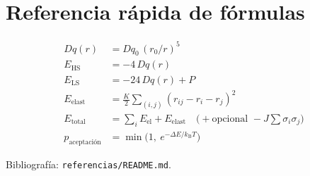\documentclass[11pt,a4paper]{article}
\newcommand{\HS}{\mathrm{HS}}
\newcommand{\LS}{\mathrm{LS}}
\newcommand{\Dq}{Dq}
\newcommand{\kb}{k_{\mathrm{B}}}
\begin{document}
\section{Referencia rápida de fórmulas}

\begin{align}
\Dq(r) &= \Dq_0\,(r_0/r)^5\\
E_{\HS} &= -4\,\Dq(r)\\
E_{\LS} &= -24\,\Dq(r) + P\\
E_{\mathrm{elast}} &= \frac{K}{2}\sum_{(i,j)}(r_{ij}-r_i-r_j)^2\\
E_{\mathrm{total}} &= \sum_i E_{\mathrm{el}} + E_{\mathrm{elast}} \quad \bigl(+\text{opcional } -J\sum\sigma_i\sigma_j\bigr)\\
p_{\mathrm{aceptación}} &= \min\!\bigl(1,\ e^{-\Delta E/\kb T}\bigr)
\end{align}

Bibliografía: \texttt{referencias/README.md}.
\end{document}
